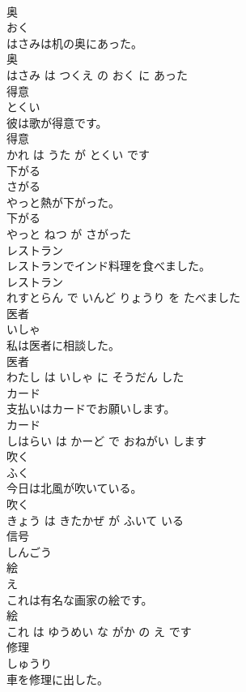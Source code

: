 \documentclass[8pt]{extreport}
\begin{document}
\begin{CJK}{UTF8}{min}
\\	奥	
\\	おく			
\\	はさみは机の奥にあった。	
\\	奥 
\\	はさみ は つくえ の おく に あった			
\\	得意	
\\	とくい			
\\	彼は歌が得意です。	
\\	得意 
\\	かれ は うた が とくい です			
\\	下がる	
\\	さがる			
\\	やっと熱が下がった。	
\\	下がる 
\\	やっと ねつ が さがった			
\\	レストラン	
\\	レストランでインド料理を食べました。	
\\	レストラン 
\\	れすとらん で いんど りょうり を たべました			
\\	医者	
\\	いしゃ			
\\	私は医者に相談した。	
\\	医者 
\\	わたし は いしゃ に そうだん した			
\\	カード	
\\	支払いはカードでお願いします。	
\\	カード 
\\	しはらい は かーど で おねがい します			
\\	吹く	
\\	ふく			
\\	今日は北風が吹いている。	
\\	吹く 
\\	きょう は きたかぜ が ふいて いる			
\\	信号	
\\	しんごう			
\\	絵	
\\	え			
\\	これは有名な画家の絵です。	
\\	絵 
\\	これ は ゆうめい な がか の え です			
\\	修理	
\\	しゅうり			
\\	車を修理に出した。	

\end{CJK}
\end{document}
